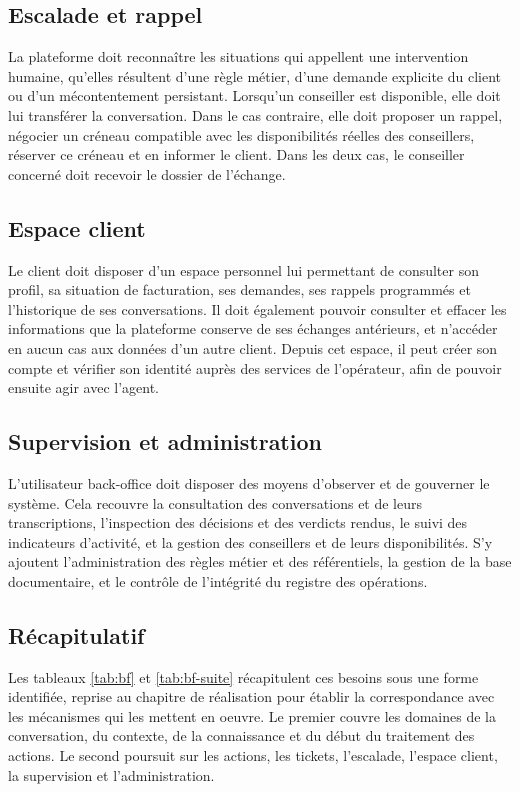 \subsection{Escalade et rappel}

La plateforme doit reconnaître les situations qui appellent une intervention humaine, qu'elles résultent d'une règle métier, d'une demande explicite du client ou d'un mécontentement persistant. Lorsqu'un conseiller est disponible, elle doit lui transférer la conversation. Dans le cas contraire, elle doit proposer un rappel, négocier un créneau compatible avec les disponibilités réelles des conseillers, réserver ce créneau et en informer le client. Dans les deux cas, le conseiller concerné doit recevoir le dossier de l'échange.

\subsection{Espace client}

Le client doit disposer d'un espace personnel lui permettant de consulter son profil, sa situation de facturation, ses demandes, ses rappels programmés et l'historique de ses conversations. Il doit également pouvoir consulter et effacer les informations que la plateforme conserve de ses échanges antérieurs, et n'accéder en aucun cas aux données d'un autre client. Depuis cet espace, il peut créer son compte et vérifier son identité auprès des services de l'opérateur, afin de pouvoir ensuite agir avec l'agent.

\subsection{Supervision et administration}

L'utilisateur back-office doit disposer des moyens d'observer et de gouverner le système. Cela recouvre la consultation des conversations et de leurs transcriptions, l'inspection des décisions et des verdicts rendus, le suivi des indicateurs d'activité, et la gestion des conseillers et de leurs disponibilités. S'y ajoutent l'administration des règles métier et des référentiels, la gestion de la base documentaire, et le contrôle de l'intégrité du registre des opérations.

\subsection{Récapitulatif}

Les tableaux \ref{tab:bf} et \ref{tab:bf-suite} récapitulent ces besoins sous une forme identifiée, reprise au chapitre de réalisation pour établir la correspondance avec les mécanismes qui les mettent en oeuvre. Le premier couvre les domaines de la conversation, du contexte, de la connaissance et du début du traitement des actions. Le second poursuit sur les actions, les tickets, l'escalade, l'espace client, la supervision et l'administration.

